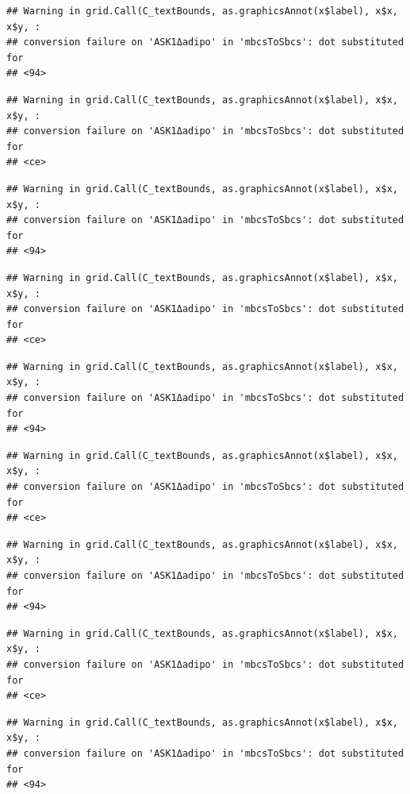 \documentclass[]{book}
\begin{document}
\begin{verbatim}
## Warning in grid.Call(C_textBounds, as.graphicsAnnot(x$label), x$x, x$y, :
## conversion failure on 'ASK1Δadipo' in 'mbcsToSbcs': dot substituted for
## <94>
\end{verbatim}

\begin{verbatim}
## Warning in grid.Call(C_textBounds, as.graphicsAnnot(x$label), x$x, x$y, :
## conversion failure on 'ASK1Δadipo' in 'mbcsToSbcs': dot substituted for
## <ce>
\end{verbatim}

\begin{verbatim}
## Warning in grid.Call(C_textBounds, as.graphicsAnnot(x$label), x$x, x$y, :
## conversion failure on 'ASK1Δadipo' in 'mbcsToSbcs': dot substituted for
## <94>
\end{verbatim}

\begin{verbatim}
## Warning in grid.Call(C_textBounds, as.graphicsAnnot(x$label), x$x, x$y, :
## conversion failure on 'ASK1Δadipo' in 'mbcsToSbcs': dot substituted for
## <ce>
\end{verbatim}

\begin{verbatim}
## Warning in grid.Call(C_textBounds, as.graphicsAnnot(x$label), x$x, x$y, :
## conversion failure on 'ASK1Δadipo' in 'mbcsToSbcs': dot substituted for
## <94>
\end{verbatim}

\begin{verbatim}
## Warning in grid.Call(C_textBounds, as.graphicsAnnot(x$label), x$x, x$y, :
## conversion failure on 'ASK1Δadipo' in 'mbcsToSbcs': dot substituted for
## <ce>
\end{verbatim}

\begin{verbatim}
## Warning in grid.Call(C_textBounds, as.graphicsAnnot(x$label), x$x, x$y, :
## conversion failure on 'ASK1Δadipo' in 'mbcsToSbcs': dot substituted for
## <94>
\end{verbatim}

\begin{verbatim}
## Warning in grid.Call(C_textBounds, as.graphicsAnnot(x$label), x$x, x$y, :
## conversion failure on 'ASK1Δadipo' in 'mbcsToSbcs': dot substituted for
## <ce>
\end{verbatim}

\begin{verbatim}
## Warning in grid.Call(C_textBounds, as.graphicsAnnot(x$label), x$x, x$y, :
## conversion failure on 'ASK1Δadipo' in 'mbcsToSbcs': dot substituted for
## <94>
\end{verbatim}
\end{document}
